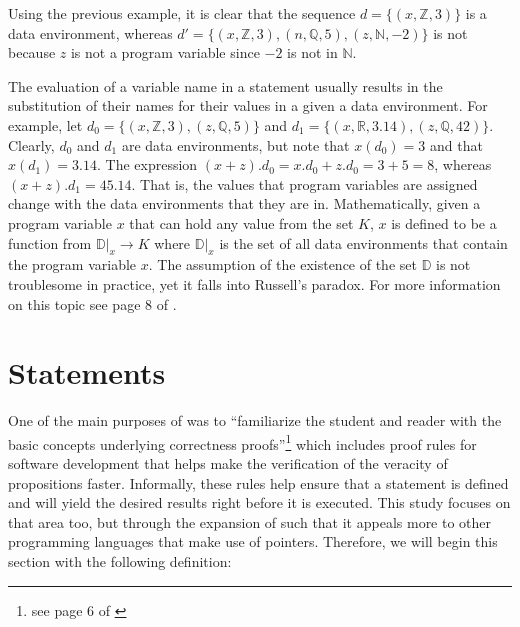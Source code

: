 \documentclass[11pt]{article}
\newcounter{definition}
\newcounter{lemma}
\newcounter{theorem}
\newcounter{example}
\newcounter{result}
\begin{document}
Using the previous example, it is clear that the sequence $d=\{(x,\mathbb{Z},3)\}$ is a data environment, whereas $d'=\{(x,\mathbb{Z},3),(n,\mathbb{Q},5),(z,\mathbb{N},-2)\}$ is not because $z$ is not a program variable since $-2$ is not in $\mathbb{N}$.

The evaluation of a variable name in a statement usually results in the substitution of their names for their values in a given a data environment. For example, let $d_0=\{(x,\mathbb{Z},3),(z,\mathbb{Q},5)\}$ and $d_1=\{(x,\mathbb{R},3.14),(z,\mathbb{Q},42)\}$. Clearly, $d_0$ and $d_1$ are data environments, but note that $x(d_0)=3$ and that $x(d_1)=3.14$. The expression $(x+z).d_0=x.d_0+z.d_0=3+5=8$, whereas $(x+z).d_1=45.14$. That is, the values that program variables are assigned change with the data environments that they are in. Mathematically, given a program variable $x$ that can hold any value from the set $K$, $x$ is defined to be a function from $\mathbb{D}|_{x} \to K$ where $\mathbb{D}|_x$ is the set of all data environments that contain the program variable $x$. The assumption of the existence of the set $\mathbb{D}$ is not troublesome in practice\cite{baber}, yet it falls into Russell's paradox. For more information on this topic see page 8 of \cite{baber}.



\section{Statements}
\setcounter{definition}{0}
\setcounter{lemma}{0}
\setcounter{theorem}{0}
\setcounter{example}{0}

One of the main purposes of \cite{baber} was to ``familiarize the student and reader with the basic concepts underlying correctness proofs''\footnote{see page 6 of \cite{baber}} which includes proof rules for software development that helps make the verification of the veracity of propositions faster. Informally, these rules help ensure that a statement is defined and will yield the desired results right before it is executed. This study focuses on that area too, but through the expansion of \cite{baber} such that it appeals more to other programming languages that make use of pointers. Therefore, we will begin this section with the following definition:
\end{document}
